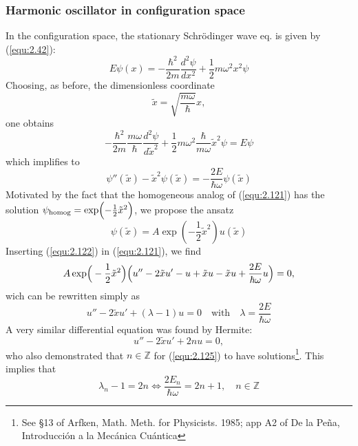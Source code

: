 \subsubsection{Harmonic oscillator in configuration space}
In the configuration space, the stationary Schrödinger wave
eq. is given by (\ref{equ:2.42}):
$$
E\psi(x) = - \frac{\hbar^2}{2m} \frac{d^2 \psi}{dx^2} +
\frac{1}{2}m\omega^2 x^2 \psi
$$
Choosing, as before, the dimensionless coordinate
\begin{equation}
  \tilde{x} = \sqrt{\frac{m\omega}{\hbar}} x,
  \label{equ:2.120}
\end{equation}
one obtains
$$
-\frac{\hbar^2}{2m} \frac{m\omega}{\hbar} \frac{d^2 \psi}{d
\tilde{x}^2} + \frac{1}{2} m \omega^2 \frac{\hbar}{m\omega}
\tilde{x}^2 \psi = E\psi
$$
which implifies to
\begin{equation}
  \psi'' (\tilde{x}) - \tilde{x}^2 \psi(\tilde{x}) = -
  \frac{2E}{\hbar\omega} \psi(\tilde{x})
  \label{equ:2.121}
\end{equation}
Motivated by the fact that the homogeneous analog of
(\ref{equ:2.121}) has the solution $\psi_{\text{homog}} =
\exp\Bigl(-\frac{1}{2}\tilde{x}^2\Bigr)$, we propose the
ansatz
\begin{equation}
  \psi(\tilde{x}) = A \exp(-\frac{1}{2}\tilde{x}^2)
  u(\tilde{x})
  \label{equ:2.122}
\end{equation}
Inserting (\ref{equ:2.122}) in (\ref{equ:2.121}), we find
\begin{equation}
  A \exp\Bigr(-\frac{1}{2}\tilde{x}^2\Bigl) \Bigl(
  u'' - 2\tilde{x}u'-u+\tilde{x}u-\tilde{x}u +
  \frac{2E}{\hbar\omega}u
  \Bigr) = 0,
  \label{equ:2.123}
\end{equation}
wich can be rewritten simply as
\begin{equation}
  u'' - 2\tilde{x}u' + (\lambda -1)u = 0 \quad \text{with}
  \quad \lambda = \frac{2E}{\hbar\omega}
  \label{equ:2.124}
\end{equation}
A very similar differential equation was found by Hermite:
\begin{equation}
  u'' - 2\tilde{x}u' + 2nu = 0,
  \label{equ:2.125}
\end{equation}
who also demonstrated that $n \in \mathbb{Z}$ for
(\ref{equ:2.125}) to have solutions\footnote{See \S 13 of
Arfken, Math. Meth. for Physicists. 1985; app A2 of De la
Peña, Introducción a la Mecánica Cuántica}.
This implies that
\begin{equation}
  \lambda_n - 1 = 2n \Leftrightarrow
  \frac{2E_n}{\hbar\omega} = 2n+1,\quad n \in \mathbb{Z}
  \label{equ:2.125}
\end{equation}
